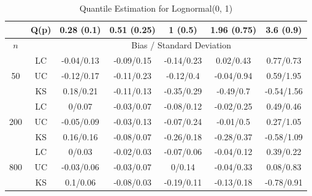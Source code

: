 \documentclass[12pt]{article}
\numberwithin{equation}{section}
\begin{document}
\begin{table}[H]

\begin{center}
\caption{Quantile Estimation for Lognormal(0, 1)}
  
\begin{tabular} {| c | c | c | c | c | c | c | } 

	 \hline
		&Q(p)&	0.28 (0.1)&	0.51 (0.25)&	1 (0.5)&	1.96 (0.75)&	3.6 (0.9)\\ 
 \hline 
 	$n$ & & \multicolumn{5}{|c|}{Bias / Standard Deviation} 
 \\ 
 \hline 
\multirow{3}{*}{50}		&	LC	&-0.04/0.13	&-0.09/0.15	&-0.14/0.23	&0.02/0.43	&0.77/0.73\\ 
			&	UC	&-0.12/0.17	&-0.11/0.23	&-0.12/0.4	&-0.04/0.94	&0.59/1.95\\ 
			&	KS	&0.18/0.21	&-0.11/0.13	&-0.35/0.29	&-0.49/0.7	&-0.54/1.56\\ 
	\hline 
\multirow{3}{*}{200}		&	LC	&0/0.07	&-0.03/0.07	&-0.08/0.12	&-0.02/0.25	&0.49/0.46\\ 
			&	UC	&-0.05/0.09	&-0.03/0.13	&-0.07/0.24	&-0.01/0.5	&0.27/1.05\\ 
			&	KS	&0.16/0.16	&-0.08/0.07	&-0.26/0.18	&-0.28/0.37	&-0.58/1.09\\ 
	\hline 
\multirow{3}{*}{800}		&	LC	&0/0.03	&-0.02/0.03	&-0.07/0.06	&-0.04/0.12	&0.39/0.22\\ 
			&	UC	&-0.03/0.06	&-0.03/0.07	&0/0.14	&-0.04/0.33	&0.08/0.83\\ 
			&	KS	&0.1/0.06	&-0.08/0.03	&-0.19/0.11	&-0.13/0.18	&-0.78/0.91\\ 
	\hline 

\end{tabular}

\end{center}
\end{table}
\end{document}

